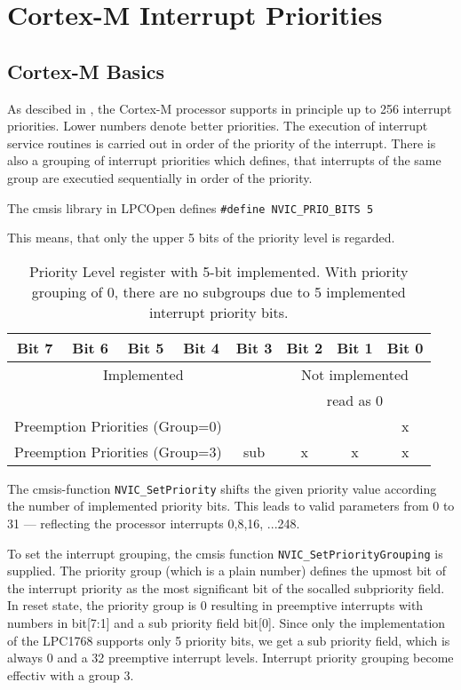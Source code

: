 \section{Cortex-M Interrupt Priorities}

\subsection{Cortex-M Basics}

As descibed in \cite{yiu}, the Cortex-M processor supports
 in principle up to 256 interrupt priorities.
Lower numbers denote better priorities.
The execution of interrupt service routines is carried out in order of
the priority of the interrupt.
There is also a grouping of interrupt priorities which defines, that 
interrupts of the same group are executied sequentially in order of the
priority.

The cmsis library in LPCOpen defines \verb|#define NVIC_PRIO_BITS 5|

This means, that only the upper 5 bits of the priority level is regarded.

\begin{table}
\begin{tabular}{|c|c|c|c|c|c|c|c|}
\hline
Bit 7 & Bit 6 & Bit 5 & Bit 4 & Bit 3 & Bit 2 & Bit 1 & Bit 0 \\
\hline
\multicolumn{5}{|c|}{Implemented}&\multicolumn{3}{c|}{Not implemented} \\
\multicolumn{5}{|c|}{}           &\multicolumn{3}{c|}{read as 0} \\
\hline
\multicolumn{7}{|l|}{Preemption Priorities (Group=0)}& x \\
\hline
\multicolumn{4}{|l|}{Preemption Priorities (Group=3)}& sub & x & x & x \\
\hline
\end{tabular}
\caption{Priority Level register with 5-bit implemented. With 
priority grouping of 0, there are no subgroups due to 5 implemented
interrupt priority bits.\cite{yiu}}
\end{table}

The cmsis-function  \verb|NVIC_SetPriority| shifts the given priority value 
according the number of implemented priority bits. This leads to
valid parameters from 0 to 31 --- reflecting the processor interrupts
0,8,16, ...248.

To set the interrupt grouping, the cmsis function 
\verb|NVIC_SetPriorityGrouping| is supplied.
The priority group (which is a plain number) defines the upmost bit of the
interrupt priority as the most significant bit
 of the socalled subpriority field.
In reset state, the priority group is 0 resulting in preemptive interrupts
 with numbers in bit[7:1] and a sub priority field bit[0].
Since only the implementation of the LPC1768 supports only 5 priority bits, we
get a sub priority field, which is always 0 and a 32 preemptive 
interrupt levels. Interrupt priority grouping become effectiv with a group 3.

